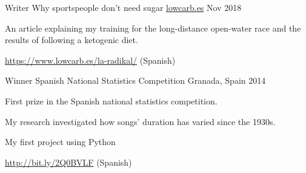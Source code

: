 

\begin{cventries}

  \cventry
    {Writer} %
    {Why sportspeople don't need sugar} %
    {\hyperlink{http://bit.ly/2zgUNMB}{lowcarb.es}} %
    {Nov 2018} %
    {
    \begin{cvitems} %
        \item {An article explaining my training for the long-distance open-water race and the results of following a ketogenic diet.}
        \item{ \hyperlink{https://www.lowcarb.es/la-radikal/}{https://www.lowcarb.es/la-radikal/} (Spanish)}
      \end{cvitems}
    }

  \cventry
    {Winner} %
    {Spanish National Statistics Competition} %
    {Granada, Spain} %
    {2014} %
    {
      \begin{cvitems} %
        \item{First prize in the Spanish national statistics competition.}
        \item{My research investigated how songs' duration has varied since the 1930s.}
        \item{My first project using Python}
        \item{\hyperlink{http://bit.ly/2Q0BVLF}{http://bit.ly/2Q0BVLF} (Spanish)}
      \end{cvitems}
    }

\end{cventries}
